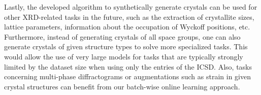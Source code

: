 Lastly, the developed algorithm to synthetically generate crystals can be used
for other XRD-related tasks in the future, such as the extraction of crystallite sizes, lattice
parameters, information about the occupation of Wyckoff positions, etc.
Furthermore, instead of generating  crystals of all space
groups, one can also generate  crystals of given structure types to solve
more specialized tasks. This would allow the use of very large models for tasks
that are typically strongly limited by the dataset size when using only the entries of
the ICSD. Also, tasks concerning multi-phase diffractograms or augmentations such as
strain in given crystal structures can benefit from our batch-wise online
learning approach.